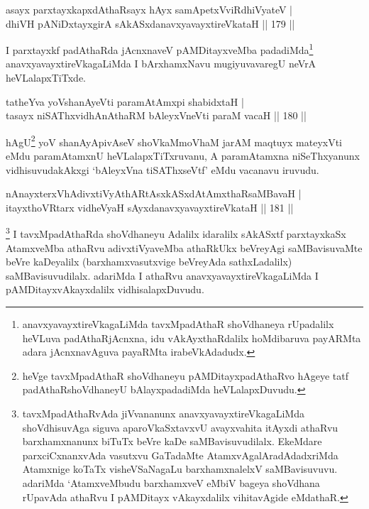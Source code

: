 
\begin{shl}
asayx parxtayxkapxdAthaRsayx hAyx samApetxVviRdhiVyateV |\\
dhiVH pANiDxtayxgirA sAkASxdanavxyavayxtireVkataH \hfill || 179 ||
\end{shl}

\begin{artha}
I parxtayxkf padAthaRda jAcnxnaveV pAMDitayxveMba padadiMda\footnote{anavxyavayxtireVkagaLiMda tavxMpadAthaR shoVdhaneya rUpadalilx heVLuva padAthaRjAcnxna, idu vAkAyxthaRdalilx hoMdibaruva payARMta adara jAcnxnavAguva payaRMta irabeVkAdadudx.} anavxyavayxtireVkagaLiMda I bArxhamxNavu mugiyuvavaregU neVrA heVLalapxTiTxde.
\end{artha}


\begin{shl}
tatheYva yoV\s shanAyeVti paramAtAmx\s pi shabidxtaH |\\
tasayx niSAThxvidhAnAthaRM bAleyxVneVti paraM vacaH \hfill || 180 ||
\end{shl}

\begin{artha}
hAgU\footnote{heVge tavxMpadAthaR shoVdhaneyu pAMDitayxpadAthaRvo hAgeye tatf padAthaRshoVdhaneyU bAlayxpadadiMda heVLalapxDuvudu.} yoV shanAyApivAseV shoVkaMmoVhaM jarAM maqtuyx mateyxVti eMdu paramAtamxnU heVLalapxTiTxruvanu, A paramAtamxna niSeThxyanunx vidhisuvudakAkxgi `bAleyxVna tiSAThxseVtf' eMdu vacanavu iruvudu.
\end{artha}

\begin{shl}
nAnayxterxVhAdivxtiVyAthARtAsxkASxdAtAmxthaRsaMBavaH |\\
itayxthoVR\s tarx vidheVyaH sAyxdanavxyavayxtireVkataH \hfill || 181 ||
\end{shl}

\begin{artha}%
\footnote{tavxMpadAthaRvAda jiVvananunx anavxyavayxtireVkagaLiMda shoVdhisuvAga siguva aparoVkaSxtavxvU avayxvahita itAyxdi athaRvu barxhamxnanunx biTuTx beVre kaDe saMBavisuvudilalx. EkeMdare parxciCxnanxvAda vasutxvu GaTadaMte AtamxvAgalAradAdadxriMda Atamxnige koTaTx visheVSaNagaLu barxhamxnalelxV saMBavisuvuvu. adariMda `AtamxveMbudu barxhamxveV eMbiV bageya shoVdhana rUpavAda athaRvu I pAMDitayx vAkayxdalilx vihitavAgide eMdathaR.} I tavxMpadAthaRda shoVdhaneyu Adalilx idaralilx sAkASxtf parxtayxkaSx AtamxveMba athaRvu adivxtiVyaveMba athaRkUkx beVreyAgi saMBavisuvaMte beVre kaDeyalilx (barxhamxvasutxvige beVreyAda sathxLadalilx) saMBavisuvudilalx. adariMda I athaRvu anavxyavayxtireVkagaLiMda I pAMDitayxvAkayxdalilx vidhisalapxDuvudu.
\end{artha}

